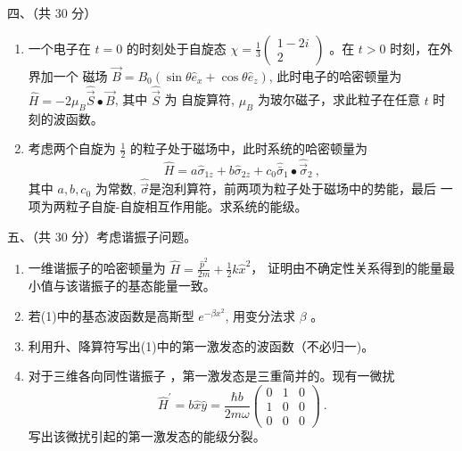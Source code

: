 四、（共 30 分）
\begin{enumerate}
	\item
	一个电子在 $t=0$ 的时刻处于自旋态 $\chi=\frac{1}{3}\left(\begin{array}{c}1-2 i \\ 2\end{array}\right)$ 。在 $t>0$ 时刻，在外界加一个
	磁场 $\vec{B}=B_{0}\left(\sin \theta \hat{e}_{x}+\cos \theta \hat{e}_{z}\right)$, 此时电子的哈密顿量为 $\hat{H}=-2 \mu_{B} \hat{\vec{S}} \bullet \vec{B}$, 其中 $\hat{\vec{S}}$ 为 自旋算符, $\mu_{B}$ 为玻尔磁子，求此粒子在任意 $t$ 时刻的波函数。
	\item 
	考虑两个自旋为 $\frac{1}{2}$ 的粒子处于磁场中，此时系统的哈密顿量为
	\[ \hat{H}=a \hat{\sigma}_{1 z}+b \hat{\sigma}_{2 z}+c_{0} \hat{\bar{\sigma}}_{1} \bullet \hat{\vec{\sigma}}_{2} ~, \]
	其中 $a, b, c_{0}$ 为常数, $\hat{\vec{\sigma}}$是泡利算符，前两项为粒子处于磁场中的势能，最后
	一项为两粒子自旋-自旋相互作用能。求系统的能级。
\end{enumerate}

五、（共 30 分）考虑谐振子问题。
\begin{enumerate}
	\item
	一维谐振子的哈密顿量为 $\hat{H}=\frac{\hat{p}^{2}}{2 m}+\frac{1}{2} k \hat{x}^{2}$，
	证明由不确定性关系得到的能量最
	小值与该谐振子的基态能量一致。
	\item 
	若(1)中的基态波函数是高斯型 $e^{-\beta x^{2}}$, 用变分法求 $\beta$ 。
	\item 
	利用升、降算符写出(1)中的第一激发态的波函数（不必归一)。
	\item 
	对于三维各向同性谐振子 ，第一激发态是三重简并的。现有一微扰
	\[ 
	\hat{H}^{\prime}=b \hat{x} \hat{y}=\frac{\hbar b}{2 m \omega}\left(\begin{array}{ccc}0 & 1 & 0 \\ 1 & 0 & 0 \\ 0 & 0 & 0\end{array}\right) ~.
	 \]
	写出该微扰引起的第一激发态的能级分裂。
\end{enumerate}
